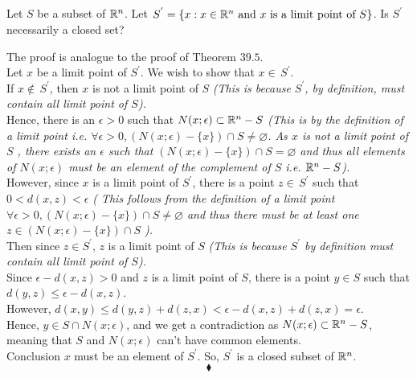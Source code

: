 \subsection{}
\begin{tcolorbox}
Let $S$ be a subset of $\mathbb{R}^n$. Let $S^{'}= \{x:x \in \mathbb{R}^n \text{ and } x \text{ is a limit point of } S\}$. Is $S^{'}$ necessarily a closed set?
\end{tcolorbox}
The proof is analogue to the proof of Theorem $\mathbf{39.5}$.\\
Let $x$ be a limit point of $S^{'}$. We wish to show that $x \in \, S^{'}$.\\
If $x \not \in \, S^{'}$, then  $x$ is not a limit point of $S$
    \textit{(This is because $S^{'}$, by definition, must contain all limit point of $S$).}\\
Hence, there is an $\epsilon  > 0$
such that $N(x; \epsilon)\subset \mathbb{R}^n- S$ 
\textit{(This is by the definition of a limit point i.e. $\forall\epsilon>0, (N(x; \epsilon)-\{x\})\cap S\neq \varnothing$. As $x$ is not a limit point of $S$ , there exists an $\epsilon$ such that  $(N(x; \epsilon)-\{x\})\cap S= \varnothing$ and thus all elements of $N(x; \epsilon)$ must be an element of the complement of $S$ i.e. $\mathbb{R}^n-S$).}\\
However, since $x$ is a limit point of $S^{'}$, there is a
point $z \in \,  S^{'}$ such that $0 < d(x, z) < \epsilon$ 
\textit{( This follows from the definition of a limit point $\forall\epsilon>0, (N(x; \epsilon)-\{x\})\cap S\neq \varnothing$ and thus there must be at least one $z\in(N(x; \epsilon)-\{x\})\cap S$ ).}\\
Then since $z\in S^{'}$, $z$ is a limit point of $S$ 
\textit{(This is because $S^{'}$ by definition must contain all limit point of $S$).}\\
Since $\epsilon - d(x, z) > 0$ and $z$ is a limit point of $S$, there is a point $y\in S$ such that
$d(y, z) \leq  \epsilon - d(x, z)$.\\
However, $d(x, y) \leq d(y, z) + d(z, x) < \epsilon - d(x, z) +d(z, x) = \epsilon$.\\
Hence, $y\in S\cap N(x;\epsilon)$, and we get a contradiction as $N(x; \epsilon)\subset \mathbb{R}^n- S$, meaning that $S$ and $N(x; \epsilon)$ can't have common elements.\\
Conclusion $x$ must be an element of $S^{'}$. So, $S^{'}$ is a closed subset of $\mathbb{R}^n$.
$$\blacklozenge$$\\

